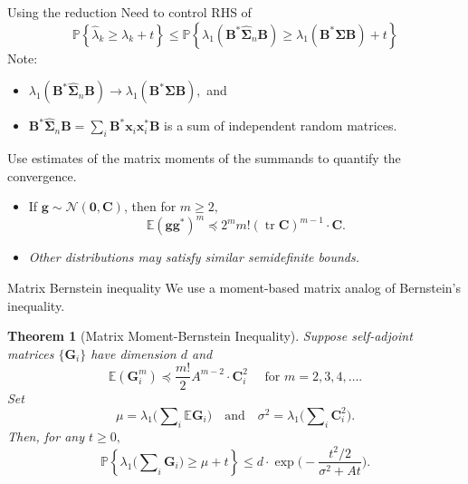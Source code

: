 \documentclass[xcolor={svgnames,pdftex,dvipsnames,table},10pt]{beamer} %
\newcommand{\mat}[1]{\ensuremath{\mathbf{#1}}}
\newcommand{\Prob}[1]{\ensuremath{\mathbb{P}\left\{#1 \right\}}}
\renewcommand{\star}{*}
\newcommand{\E}{\ensuremath{\mathbb{E}}}
\DeclareMathOperator{\tr}{tr}
\newtheorem*{thm}{Theorem}
\begin{document}
\begin{frame}{Using the reduction}
Need to control RHS of 
\[
\Prob{\hat{\lambda}_k \geq \lambda_k + t }
\leq
\Prob{
\lambda_1(\mat{B}^\star \widehat{\mat{\Sigma}}_n \mat{B}) \geq  
\lambda_1(\mat{B}^\star \mat{\Sigma} \mat{B}) + t 
}
\]
\pause
Note:
\begin{itemize}
	\item 
$\lambda_1(\mat{B}^\star \hat{\mat{\Sigma}}_n \mat{B}) \rightarrow \lambda_1(\mat{B}^\star \mat{\Sigma} \mat{B}),$ and
	\item $\mat{B}^\star \hat{\mat{\Sigma}}_n \mat{B} = \sum\nolimits_i \mat{B}^\star \mat{x}_i\mat{x}_i^\star \mat{B}$ is a sum of independent random matrices.
\end{itemize}
\pause
Use estimates of the matrix moments of the summands to quantify the convergence. 

\begin{itemize}
\pause
\item If $\mat{g} \sim \mathcal{N}(\mat{0}, \mat{C})$, then for $m \geq 2,$
\[
\E(\mat{g}\mat{g}^\star)^m \preceq 2^m m! (\tr{\mat{C}})^{m-1} \cdot \mat{C}.
\]
\pause
\item \emph{Other distributions may satisfy similar semidefinite bounds.}
\end{itemize}

\end{frame}

%

\begin{frame}{Matrix Bernstein inequality }
 We use a moment-based matrix analog of Bernstein's inequality.

\begin{thm}[Matrix Moment-Bernstein Inequality]
Suppose self-adjoint matrices $\{\mat{G}_i\}$ have dimension $d$ and 
\[ \E(\mat{G}_i^m) \preceq \frac{m!}{2} A^{m-2} \cdot \mat{C}_i^2 \quad \text{ for } m =2,3,4,\ldots.
\]
Set
\[ \mu = \lambda_1\Big( \sum\nolimits_i \E\mat{G}_i \Big) \quad \text{and} \quad \sigma^2 = \lambda_1\Big(\sum\nolimits_i \mat{C}_i^2 \Big). \]
Then, for any $t \geq 0,$
\[	
 \Prob{ \lambda_1\Big(\sum\nolimits_i \mat{G}_i\Big) \geq \mu + t } \leq d \cdot \exp\Big(- \frac{t^2/2}{\sigma^2 + At} \Big).
\]
\end{thm}

\end{frame}
\end{document}
